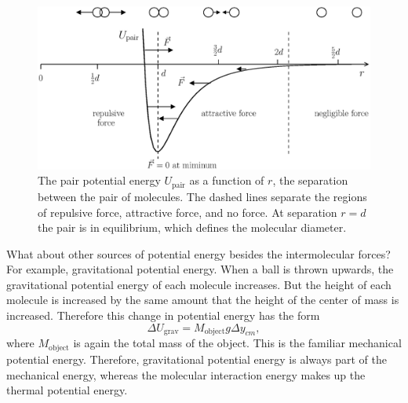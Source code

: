 \begin{figure}
\begin{center}
\includegraphics[width=5in]{thermal_energy_and_solids/pair_potential.eps}
\caption{The pair potential energy $U_\text{pair}$ as a function of $r$, the
  separation between the pair of molecules.  The dashed lines separate
  the regions of repulsive force, attractive force, and no force.  At
  separation $r=d$ the pair is in equilibrium, which defines the
  molecular diameter.}
\label{fig:pair_potential}
\end{center}
\end{figure}

What about other sources of potential energy besides the
intermolecular forces?  For example, gravitational potential energy.
When a ball is thrown upwards, the gravitational potential energy of
each molecule increases.  But the height of each molecule is increased
by the same amount that the height of the center of mass is increased.
Therefore this change in potential energy has the form
\begin{equation}
\Delta U_\text{grav} = M_\text{object} g\Delta y_{cm},
\end{equation}
where $M_\text{object}$ is again the total mass of the object.  This
is the familiar mechanical potential energy.  Therefore, gravitational
potential energy is always part of the mechanical energy, whereas the
molecular interaction energy makes up the thermal potential energy.

